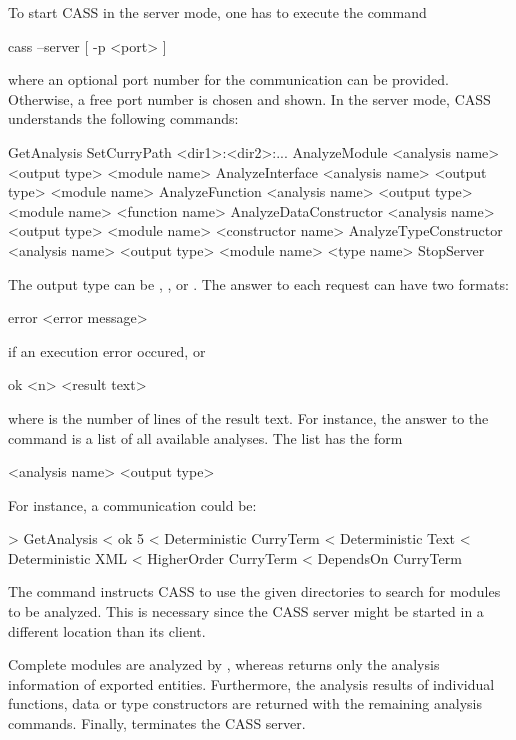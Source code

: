To start CASS in the server mode, one has to execute the command
\begin{curry}
cass --server [ -p <port> ]
\end{curry}
where an optional port number for the communication can be
provided. Otherwise, a free port number is chosen and shown. In the
server mode, CASS understands the following commands:
\begin{curry}
GetAnalysis
SetCurryPath <dir1>:<dir2>:...
AnalyzeModule          <analysis name> <output type> <module name>
AnalyzeInterface       <analysis name> <output type> <module name>
AnalyzeFunction        <analysis name> <output type> <module name> <function name>
AnalyzeDataConstructor <analysis name> <output type> <module name> <constructor name>
AnalyzeTypeConstructor <analysis name> <output type> <module name> <type name>
StopServer
\end{curry}
The output type can be , , or .
The answer to each request can have two formats:
\begin{curry}
error <error message>
\end{curry}
if an execution error occured, or
\begin{curry}
ok <n>
<result text>
\end{curry}
where  is the number of lines of the result text.
For instance, the answer to the command 
is a list of all available analyses. The list has the form
\begin{curry}
<analysis name> <output type>
\end{curry}
For instance, a communication could be:
\begin{curry}
> GetAnalysis
< ok 5
< Deterministic CurryTerm
< Deterministic Text
< Deterministic XML
< HigherOrder   CurryTerm
< DependsOn     CurryTerm
\end{curry}
The command  instructs CASS to use the given
directories to search for modules to be analyzed. This is necessary
since the CASS server might be started in a different location than
its client.

Complete modules are analyzed by , whereas
 returns only the analysis information of exported
entities. Furthermore, the analysis results of individual functions,
data or type constructors are returned with the remaining analysis
commands. Finally,  terminates the CASS server.

